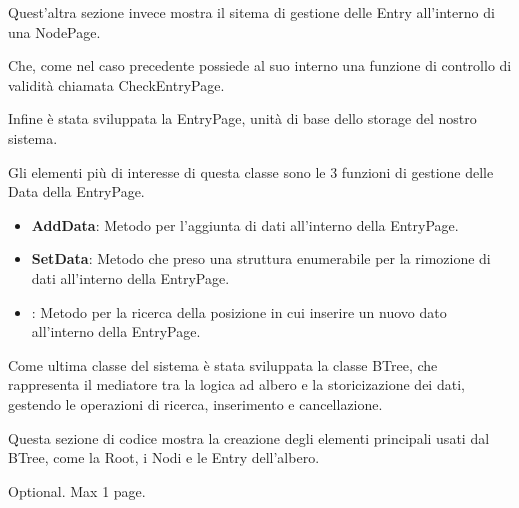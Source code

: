\documentclass[12pt,a4paper,openright,twoside]{book}
\begin{document}
            

            Quest'altra sezione invece mostra il sitema di gestione delle Entry all'interno di una NodePage.

            Che, come nel caso precedente possiede al suo interno una funzione di controllo di validità chiamata CheckEntryPage.

            Infine è stata sviluppata la EntryPage, unità di base dello storage del nostro sistema.

            

            Gli elementi più di interesse di questa classe sono le 3 funzioni di gestione delle Data della EntryPage.

            \begin{itemize}
                \item \textbf{AddData}: Metodo per l'aggiunta di dati all'interno della EntryPage.
                \item \textbf{SetData}: Metodo che preso una struttura enumerabile per la rimozione di dati all'interno della EntryPage.
                \item {}: Metodo per la ricerca della posizione in cui inserire un nuovo dato all'interno della EntryPage.
            \end{itemize}

            Come ultima classe del sistema è stata sviluppata la classe BTree, che rappresenta il mediatore tra la logica ad albero e la storicizazione dei dati, gestendo le operazioni di ricerca, inserimento e cancellazione.

            

            Questa sezione di codice mostra la creazione degli elementi principali usati dal BTree, come la Root, i Nodi e le Entry dell'albero.

            



\backmatter

\nocite{*} %




\begin{acknowledgements} %
Optional. Max 1 page.
\end{acknowledgements}
\end{document}
